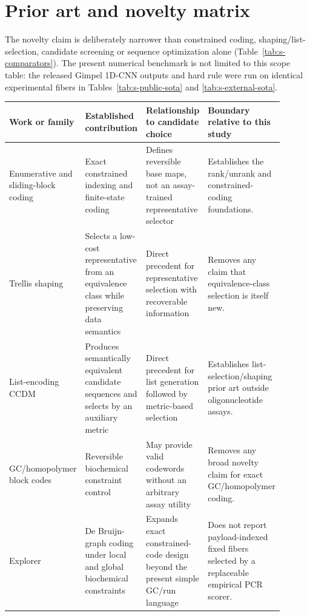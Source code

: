 \documentclass[10pt]{article}
\begin{document}
\section{Prior art and novelty matrix}

The novelty claim is deliberately narrower than constrained coding, shaping/list-selection, candidate screening or sequence optimization alone (Table~\ref{tab:s-comparators}). The present numerical benchmark is not limited to this scope table: the released Gimpel 1D-CNN outputs and hard rule were run on identical experimental fibers in Tables~\ref{tab:s-public-sota} and \ref{tab:s-external-sota}.

\begin{table}[H]
\centering
\scriptsize
\begin{tabular}{>{\raggedright\arraybackslash}p{0.16\linewidth}>{\raggedright\arraybackslash}p{0.22\linewidth}>{\raggedright\arraybackslash}p{0.24\linewidth}>{\raggedright\arraybackslash}p{0.28\linewidth}}
\toprule
Work or family & Established contribution & Relationship to candidate choice & Boundary relative to this study \\
\midrule
Enumerative and sliding-block coding \cite{cover1973enumerative,adler1983slidingblock} & Exact constrained indexing and finite-state coding & Defines reversible base maps, not an assay-trained representative selector & Establishes the rank/unrank and constrained-coding foundations. \\
Trellis shaping \cite{forney1992trellisshaping} & Selects a low-cost representative from an equivalence class while preserving data semantics & Direct precedent for representative selection with recoverable information & Removes any claim that equivalence-class selection is itself new. \\
List-encoding CCDM \cite{wu2022listccdm} & Produces semantically equivalent candidate sequences and selects by an auxiliary metric & Direct precedent for list generation followed by metric-based selection & Establishes list-selection/shaping prior art outside oligonucleotide assays. \\
GC/homopolymer block codes \cite{wang2019bioconstrained,immink2019balancedhomopolymer} & Reversible biochemical constraint control & May provide valid codewords without an arbitrary assay utility & Removes any broad novelty claim for exact GC/homopolymer coding. \\
Explorer \cite{dou2024explorer} & De Bruijn-graph coding under local and global biochemical constraints & Expands exact constrained-code design beyond the present simple GC/run language & Does not report payload-indexed fixed fibers selected by a replaceable empirical PCR scorer. \\

\end{tabular}
\end{table}
\end{document}
